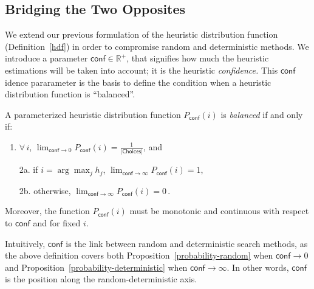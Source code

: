 \documentclass{ws-ijait}
\begin{document}
\subsection{Bridging the Two Opposites}

We extend our previous formulation of the heuristic distribution function (Definition~\ref{hdf}) in order to compromise random and deterministic methods. We introduce a parameter $\mathsf{conf} \in \mathbb{R}^+$, that signifies how much the heuristic estimations will be taken into account; it is the heuristic \emph{confidence.} This $\mathsf{conf}$idence pararameter is the basis to define the condition when a heuristic distribution function is ``balanced''.
\begin{definition}
\label{balanced}
A parameterized heuristic distribution function $P_\mathsf{conf} (i)$ is \emph{balanced} if and only if:
\begin{enumerate}
\item
$\forall \, i$,
${\displaystyle \lim_{\mathsf{conf} \to 0} }  \!\!
P_\mathsf{conf} (i) = \frac{1}{|\mathsf{Choices}|}$, and
%
\item[2a.]
if $i = \arg\max_j h_j$,
${\displaystyle \lim_{\mathsf{conf} \to \infty} }  \!\!\!\!
        P_\mathsf{conf} (i) = 1$,
%
\item[2b.]
otherwise,
${\displaystyle \lim_{\mathsf{conf} \to \infty} }  \!\!\!\!
        P_\mathsf{conf} (i) = 0 \,$.
\end{enumerate}
Moreover, the function $P_\mathsf{conf} (i)$ must be monotonic and continuous with respect to $\mathsf{conf}$ and for fixed $i$.
\end{definition}
Intuitively, $\mathsf{conf}$ is the link between random and deterministic search methods, as the above definition covers both Proposition~\ref{probability-random} when $\mathsf{conf} \to 0$ and Proposition~\ref{probability-deterministic} when $\mathsf{conf} \to \infty$. In other words, $\mathsf{conf}$ is the position along the random-deterministic axis.
\end{document}
